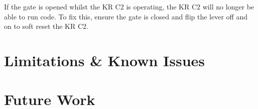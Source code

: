 \documentclass{ol-softwaremanual}
\newcommand{\doclink}[2]{\href{#1}{#2}\footnote{\url{#1}}}
\begin{document}
If the gate is opened whilst the KR C2 is operating, the KR C2 will no longer be able to run code. To fix this, ensure the gate is closed and flip the lever off and on to soft reset the KR C2.

\section{Limitations \& Known Issues}

\section{Future Work}

\appendix


% 


% 
\end{document}
